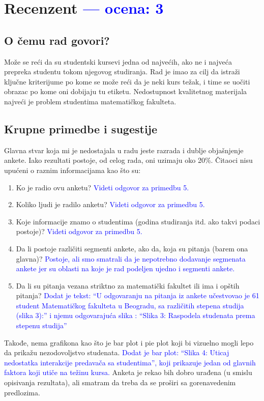 \documentclass[a4paper]{report}
\newcommand{\odgovor}[1]{\textcolor{blue}{#1}}
\begin{document}
\chapter{Recenzent \odgovor{--- ocena: 3} }


\section{O čemu rad govori?}
Može se reći da su studentski kursevi jedna od najvećih, ako ne i najveća prepreka studentu tokom njegovog studiranja. Rad je imao za cilj da istraži ključne kriterijume po kome se može reći da je neki kurs težak, i time se uočiti obrazac po kome oni dobijaju tu etiketu. Nedostupnost kvalitetnog materijala najveći je problem studentima matematičkog fakulteta.

\section{Krupne primedbe i sugestije}
Glavna stvar koja mi je nedostajala u radu jeste razrada i dublje objašnjenje ankete. Iako rezultati postoje, od celog rada, oni uzimaju oko 20\%. Čitaoci nisu upućeni o raznim informacijama kao što su:
\begin{enumerate}
\item Ko je radio ovu anketu?
\odgovor{Videti odgovor za primedbu 5.}
\item Koliko ljudi je radilo anketu?
\odgovor{Videti odgovor za primedbu 5.}
\item Koje informacije znamo o studentima (godina studiranja itd. ako takvi podaci postoje)?
\odgovor{Videti odgovor za primedbu 5.}
\item Da li postoje različiti segmenti ankete, ako da, koja su pitanja (barem ona glavna)?
\odgovor{ Postoje, ali smo smatrali da je nepotrebno dodavanje segmenata ankete jer
 su oblasti na koje je rad podeljen ujedno i segmenti ankete.}
\item Da li su pitanja vezana striktno za matematički fakultet ili ima i opštih pitanja?
\odgovor{Dodat je tekst: “U odgovaranju na pitanja iz ankete učestvovao je 61 student
Matematičkog fakulteta u Beogradu, sa različitih stepena studija (slika 3):” i njemu
odgovarajuća slika : “Slika 3:  Raspodela studenata prema stepenu studija”}
\end{enumerate}
Takođe, nema grafikona kao što je bar plot i pie plot koji bi vizuelno mogli lepo da prikažu nezodovoljstvo studenata.
\odgovor{ Dodat je bar plot: “Slika 4: Uticaj nedostatka interakcije predavača sa
 studentima”, koji prikazuje jedan od glavnih faktora koji utiče na težinu kursa.}
 Anketa je rekao bih dobro urađena (u smislu opisivanja rezultata), ali smatram da treba da se proširi sa gorenavedenim predlozima.
\newline
\end{document}
